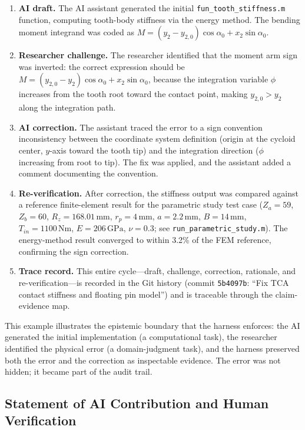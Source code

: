 \documentclass{article}
\newcommand{\revmark}{\marginpar{\footnotesize\textcolor{blue}{\textbf{Rev.\,2}}}}
\begin{document}
\begin{enumerate}
    \item \textbf{AI draft.} The AI assistant generated the initial \texttt{fun\_tooth\_stiffness.m} function, computing tooth-body stiffness via the energy method. The bending moment integrand was coded as $M = (y_2 - y_{2,0}) \cos\alpha_0 + x_2 \sin\alpha_0$.
    \item \textbf{Researcher challenge.} The researcher identified that the moment arm sign was inverted: the correct expression should be $M = (y_{2,0} - y_2) \cos\alpha_0 + x_2 \sin\alpha_0$, because the integration variable $\phi$ increases from the tooth root toward the contact point, making $y_{2,0} > y_2$ along the integration path.
    \item \textbf{AI correction.} The assistant traced the error to a sign convention inconsistency between the coordinate system definition (origin at the cycloid center, $y$-axis toward the tooth tip) and the integration direction ($\phi$ increasing from root to tip). The fix was applied, and the assistant added a comment documenting the convention.
    \item \textbf{Re-verification.} After correction, the stiffness output was compared against a reference finite-element result for the parametric study test case ($Z_a = 59$, $Z_b = 60$, $R_z = 168.01\,\mathrm{mm}$, $r_p = 4\,\mathrm{mm}$, $a = 2.2\,\mathrm{mm}$, $B = 14\,\mathrm{mm}$, $T_{in} = 1100\,\mathrm{Nm}$, $E = 206\,\mathrm{GPa}$, $\nu = 0.3$; see \texttt{run\_parametric\_study.m}). The energy-method result converged to within 3.2\% of the FEM reference, confirming the sign correction.
    \item \textbf{Trace record.} This entire cycle---draft, challenge, correction, rationale, and re-verification---is recorded in the Git history (commit \texttt{5b4097b}: ``Fix TCA contact stiffness and floating pin model'') and is traceable through the claim-evidence map.
\end{enumerate}

This example illustrates the epistemic boundary that the harness enforces: the AI generated the initial implementation (a computational task), the researcher identified the physical error (a domain-judgment task), and the harness preserved both the error and the correction as inspectable evidence. The error was not hidden; it became part of the audit trail.

\subsection{Statement of AI Contribution and Human Verification}\revmark
\end{document}
